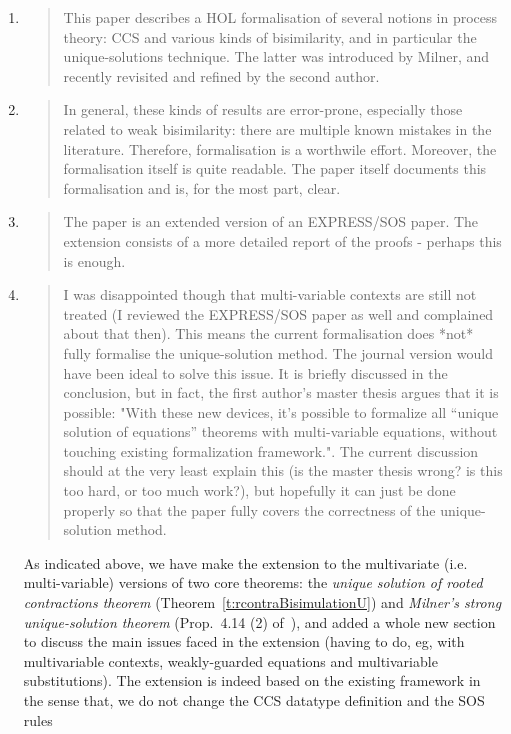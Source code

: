 \begin{enumerate}
\item \begin{quote}
    This paper describes a HOL formalisation of several notions in
    process theory: CCS and various kinds of bisimilarity, and in
    particular the unique-solutions technique. The latter was
    introduced by Milner, and recently revisited and refined by the
    second author.
  \end{quote}
  
\item \begin{quote}
    In general, these kinds of results are error-prone, especially
    those related to weak bisimilarity: there are multiple known
    mistakes in the literature. Therefore, formalisation is a
    worthwile effort. Moreover, the formalisation itself is quite
    readable. The paper itself documents this formalisation and is,
    for the most part, clear.
  \end{quote}

\item \begin{quote}
    The paper is an extended version of an EXPRESS/SOS paper. The
    extension consists of a more detailed report of the proofs -
    perhaps this is enough.
  \end{quote}

\item \begin{quote}
    I was disappointed though that multi-variable contexts are still
    not treated (I reviewed the EXPRESS/SOS paper as well and
    complained about that then). This means the current formalisation
    does *not* fully formalise the unique-solution method. The journal
    version would have been ideal to solve this issue. It is briefly
    discussed in the conclusion, but in fact, the first author's
    master thesis argues that it is possible: "With these new devices,
    it’s possible to formalize all “unique solution of equations”
    theorems with multi-variable equations, without touching existing
    formalization framework.". The current discussion should at the
    very least explain this (is the master thesis wrong? is this too
    hard, or too much work?), but hopefully it can just be done
    properly so that the paper fully covers the correctness of the
    unique-solution method. 
  \end{quote}

\Mark  As indicated  above,  we have make the extension to the multivariate (i.e. multi-variable)
  versions of two core theorems:  the \emph{unique solution of rooted contractions theorem}
  (Theorem~\ref{t:rcontraBisimulationU}) and \emph{Milner's strong
  unique-solution theorem} (Prop.~4.14 (2)
  of~\citep[p.~103]{Mil89}), and added a whole new section to  discuss the main issues
  faced in the  extension (having to do, eg, with 
  multivariable  contexts, weakly-guarded equations and multivariable substitutions). 
The extension  is indeed based on the existing framework in
  the sense that, we do not  change the CCS datatype definition
  and the  SOS rules


\end{enumerate}
